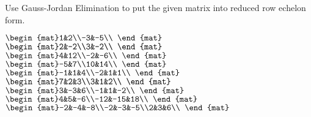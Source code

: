 

\begin{Exercise}[
name={},
title={}, 
difficulty=0,
origin={\cite{GH}}]
Use Gauss-Jordan Elimination to put the given matrix into reduced row echelon form.
\begin{multicols}{3}
\Question $\begin{mat}1&2\\-3&-5\\ \end{mat}$
\Question $\begin{mat}2&-2\\3&-2\\ \end{mat}$
\Question $\begin{mat}4&12\\-2&-6\\ \end{mat}$
\Question $\begin{mat}-5&7\\10&14\\ \end{mat}$
\Question $\begin{mat}-1&1&4\\-2&1&1\\ \end{mat}$
\Question $\begin{mat}7&2&3\\3&1&2\\ \end{mat}$
\Question $\begin{mat}3&-3&6\\-1&1&-2\\ \end{mat}$
\Question $\begin{mat}4&5&-6\\-12&-15&18\\ \end{mat}$
\Question $\begin{mat}-2&-4&-8\\-2&-3&-5\\2&3&6\\ \end{mat}$

\end{multicols}
\end{Exercise}
